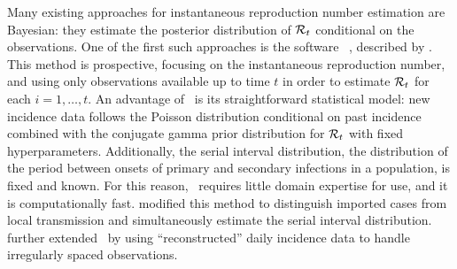 Many existing approaches for instantaneous reproduction number estimation are
Bayesian: they estimate the posterior distribution of $\mathcal{R}_t$ conditional on
the observations. One of the first such approaches is the software \EpiEstim\
\citep{cori2020package}, described by \cite{cori2013new}. This method
is prospective, focusing on the instantaneous reproduction number, and using
only observations available up to time $t$ in order to estimate $\mathcal{R}_t$ for
each $i = 1,\ldots, t$. An advantage of \EpiEstim\ is its straightforward
statistical model: new incidence data follows the Poisson distribution
conditional on past incidence combined with the conjugate gamma prior
distribution for $\mathcal{R}_t$ with fixed hyperparameters. Additionally, the serial
interval distribution, the distribution of the period between onsets of primary
and secondary infections in a population, is fixed and known. For this reason,
\EpiEstim\ requires little domain expertise for use, and it is computationally
fast. \citet{thompson2019improved} modified this method to
distinguish imported cases from local transmission and simultaneously estimate
the serial interval distribution. \citet{nash2023estimating} further
extended \EpiEstim\ by using ``reconstructed'' daily incidence data to handle
irregularly spaced observations. 

